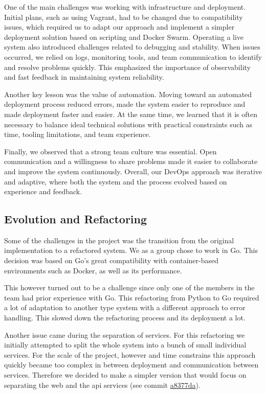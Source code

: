 One of the main challenges was working with infrastructure and deployment. Initial plans, such as using Vagrant, had to be changed due to compatibility issues, which required us to adapt our approach and implement a simpler deployment solution based on scripting and Docker Swarm. Operating a live system also introduced challenges related to debugging and stability. When issues occurred, we relied on logs, monitoring tools, and team communication to identify and resolve problems quickly. This emphasized the importance of observability and fast feedback in maintaining system reliability.

Another key lesson was the value of automation. Moving toward an automated deployment process reduced errors, made the system easier to reproduce and made deployment faster and easier. At the same time, we learned that it is often necessary to balance ideal technical solutions with practical constraints such as time, tooling limitations, and team experience.

Finally, we observed that a strong team culture was essential. Open communication and a willingness to share problems made it easier to collaborate and improve the system continuously. Overall, our DevOps approach was iterative and adaptive, where both the system and the process evolved based on experience and feedback.

\subsection{Evolution and Refactoring }

Some of the challenges in the project was the transition from the original implementation to a refactored system. We as a group chose to work in Go. This decision was based on Go’s great compatibility with container-based environments such as Docker, as well as its performance.

This however turned out to be a challenge since only one of the members in the team had prior experience with Go. This refactoring from Python to Go required a lot of adaptation to another type system with a different approach to error handling. This slowed down the refactoring process and its deployment a lot.

Another issue came during the separation of services. For this refactoring we initially attempted to split the whole system into a bunch of small individual services. For the scale of the project, however and time constrains this approach quickly became too complex in between deployment and communication between services. Therefore we decided to make a simpler version that would focus on separating the web and the api services (see commit \href{https://github.com/sebsthiel/minitwit-devops/commit/a8377dab525ee6f05cba84210267da76e0edc6fe}{a8377da}).



